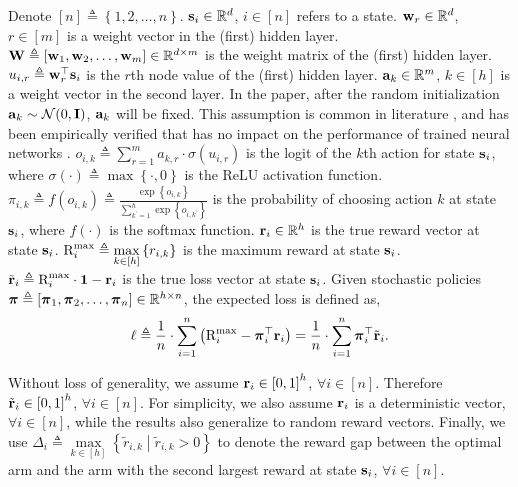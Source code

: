 Denote $[n] \triangleq \left\{ 1,2, \dots, n \right\}$. ${\mathbf{s}}_i \in {\mathbb{R}}^d$, $i \in [n]$ refers to a state. ${\mathbf{w}}_r \in {\mathbb{R}}^d$, $r \in [m]$ is a weight vector in the (first) hidden layer. ${\mathbf{W}} \triangleq \left[ {\mathbf{w}}_1, {\mathbf{w}}_2, \dots, {\mathbf{w}}_m \right] \in {\mathbb{R}}^{d \times m}$ is the weight matrix of the (first) hidden layer. $u_{i,r} \triangleq {\mathbf{w}}_r^\top {\mathbf{s}}_i$ is the $r$th node value of the (first) hidden layer. ${\mathbf{a}}_k \in {\mathbb{R}}^m$, $k \in [h]$ is a weight vector in the second layer. In the paper, after the random initialization ${\mathbf{a}}_k \sim {\mathcal{N}}(0, {\mathbf{I}})$, ${\mathbf{a}}_k$ will be fixed. This assumption is common in literature \citep{li2018learning,du2018gradientA,du2018gradientB,allen2018convergenceA,allen2018convergenceB}, and has been empirically verified that has no impact on the performance of trained neural networks \citep{hoffer2018fix}. $o_{i,k} \triangleq \sum\limits_{r=1}^{m}{a_{k,r} \cdot \sigma\left( u_{i,r} \right)}$ is the logit of the $k$th action for state ${\mathbf{s}}_i$, where $\sigma(\cdot) \triangleq \max\left\{ \cdot, 0 \right\}$ is the ReLU activation function. $\pi_{i,k} \triangleq f\left( o_{i,k} \right) \triangleq \frac{\exp\left\{ o_{i,k} \right\}}{\sum\limits_{k^\prime = 1}^{h}{\exp\left\{ o_{i,k^\prime} \right\}}}$ is the probability of choosing action $k$ at state ${\mathbf{s}}_i$, where $f(\cdot)$ is the softmax function. ${\mathbf{r}}_i \in {\mathbb{R}}^h$ is the true reward vector at state ${\mathbf{s}}_i$. ${\text{R}}_i^{\max} \triangleq \max\limits_{k \in [h]}\left\{ r_{i,k} \right\}$ is the maximum reward at state ${\mathbf{s}}_i$. ${\tilde{\mathbf{r}}}_i \triangleq {\text{R}}_i^{\max} \cdot {\mathbf{1}} - {\mathbf{r}}_i$ is the true loss vector at state ${\mathbf{s}}_i$. Given stochastic policies ${\boldsymbol{\pi}} \triangleq \left[ {\boldsymbol{\pi}}_1, {\boldsymbol{\pi}}_2, \dots, {\boldsymbol{\pi}}_n \right] \in {\mathbb{R}}^{h \times n}$, the expected loss is defined as,
\begin{equation}
\label{eq:expected_loss}
\begin{split}
    \ell \triangleq \frac{1}{n} \cdot \sum\limits_{i=1}^{n}{ \left( {\text{R}}_i^{\max} - {\boldsymbol{\pi}}_i^\top {\mathbf{r}}_i \right) } = \frac{1}{n} \cdot \sum\limits_{i=1}^{n}{ {\boldsymbol{\pi}}_{i}^\top {\tilde{\mathbf{r}}}_{i} }.
\end{split}
\end{equation}

Without loss of generality, we assume ${\mathbf{r}}_i \in \left[ 0, 1 \right]^h$, $\forall i \in [n]$. Therefore ${\tilde{\mathbf{r}}}_i \in \left[ 0, 1 \right]^h$, $\forall i \in [n]$. For simplicity, we also assume ${\mathbf{r}}_i$ is a deterministic vector, $\forall i \in [n]$, while the results also generalize to random reward vectors. Finally, we use $\Delta_i \triangleq \max\limits_{k \in [h]}\left\{ \tilde{r}_{i,k} \middle| \tilde{r}_{i,k} > 0 \right\}$ to denote the reward gap between the optimal arm and the arm with the second largest reward at state ${\mathbf{s}}_i$, $\forall i \in [n]$.